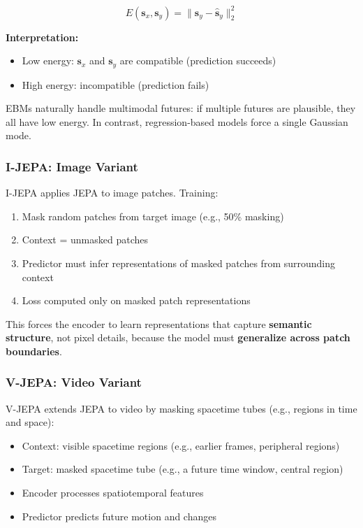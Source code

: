 \[
E(\mathbf{s}_x, \mathbf{s}_y) = \| \mathbf{s}_y - \hat{\mathbf{s}}_y \|_2^2
\]

\textbf{Interpretation:}
\begin{itemize}
    \item Low energy: $\mathbf{s}_x$ and $\mathbf{s}_y$ are compatible (prediction succeeds)
    \item High energy: incompatible (prediction fails)
\end{itemize}

EBMs naturally handle multimodal futures: if multiple futures are plausible, they all have low energy. In contrast, regression-based models force a single Gaussian mode.

\subsubsection{I-JEPA: Image Variant}

I-JEPA applies JEPA to image patches. Training:

\begin{enumerate}
    \item Mask random patches from target image (e.g., 50\% masking)
    \item Context = unmasked patches
    \item Predictor must infer representations of masked patches from surrounding context
    \item Loss computed only on masked patch representations
\end{enumerate}

This forces the encoder to learn representations that capture \textbf{semantic structure}, not pixel details, because the model must \textbf{generalize across patch boundaries}.

\subsubsection{V-JEPA: Video Variant}

V-JEPA extends JEPA to video by masking spacetime tubes (e.g., regions in time and space):

\begin{itemize}
    \item Context: visible spacetime regions (e.g., earlier frames, peripheral regions)
    \item Target: masked spacetime tube (e.g., a future time window, central region)
    \item Encoder processes spatiotemporal features
    \item Predictor predicts future motion and changes
\end{itemize}

